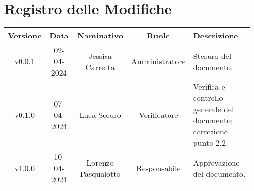 \section*{\Large Registro delle Modifiche}
    \begin{table}[h]
        \centering
        \renewcommand\tabularxcolumn[1]{m{#1}} %
        \renewcommand{\arraystretch}{1.5}
        \begin{tabularx}{0.98\textwidth}
            {c|c|c|c|>{\centering\arraybackslash}X}
            \rowcolor{black}
            \textbf{\color{white} Versione} & \textbf{\color{white} Data} & \textbf{\color{white} Nominativo} & \textbf{\color{white} Ruolo} & \textbf{\color{white} Descrizione} \\ 
            \hline

            v0.0.1 & 02-04-2024 & Jessica Carretta & Amministratore & Stesura del documento.\\
            v0.1.0 & 07-04-2024 & Luca Securo & Verificatore & Verifica e controllo generale del documento; correzione punto 2.2.\\
            v1.0.0 & 10-04-2024 & Lorenzo Pasqualotto & Responsabile & Approvazione del documento.\\
           
            \hline
        \end{tabularx}
    \end{table}